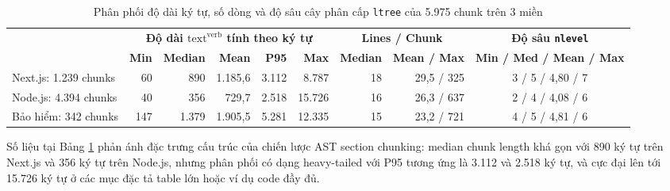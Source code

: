 \begin{table}[H]
\centering
\caption{Phân phối độ dài ký tự, số dòng và độ sâu cây phân cấp \texttt{ltree} của 5.975 chunk trên 3 miền}
\label{tab:chunk_dist}
\footnotesize\setlength{\tabcolsep}{4pt}\begin{tabularx}{\textwidth}{>{\raggedright\arraybackslash}Xrrrrrrrc}
\toprule
\multirow{2}{*}{\textbf{Miền tài liệu}} & \multicolumn{5}{c}{\textbf{Độ dài $\text{text}^{\text{verb}}$ tính theo ký tự}} & \multicolumn{2}{c}{\textbf{Lines / Chunk}} & \textbf{Độ sâu \texttt{nlevel}} \\
\cmidrule(lr){2-6}\cmidrule(lr){7-8}\cmidrule(lr){9-9}
 & \textbf{Min} & \textbf{Median} & \textbf{Mean} & \textbf{P95} & \textbf{Max} & \textbf{Median} & \textbf{Mean / Max} & \textbf{Min / Med / Mean / Max} \\
\midrule
Next.js: 1.239 chunks & 60 & 890 & 1.185,6 & 3.112 & 8.787 & 18 & 29,5 / 325 & 3 / 5 / 4,80 / 7 \\
Node.js: 4.394 chunks & 40 & 356 & 729,7 & 2.518 & 15.726 & 16 & 26,3 / 637 & 2 / 4 / 4,08 / 6 \\
Bảo hiểm: 342 chunks & 147 & 1.379 & 1.905,5 & 5.281 & 12.335 & 15 & 23,2 / 721 & 4 / 5 / 4,81 / 6 \\
\bottomrule
\end{tabularx}
\end{table}

Số liệu tại Bảng \ref{tab:chunk_dist} phản ánh đặc trưng cấu trúc của chiến lược AST section chunking: median chunk length khá gọn với 890 ký tự trên Next.js và 356 ký tự trên Node.js, nhưng phân phối có dạng heavy-tailed với P95 tương ứng là 3.112 và 2.518 ký tự, và cực đại lên tới 15.726 ký tự ở các mục đặc tả table lớn hoặc ví dụ code đầy đủ.

